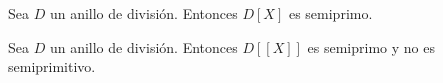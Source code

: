 \begin{example}
	Sea $D$ un anillo de división. Entonces $D[X]$ es semiprimo.
\end{example}

\begin{example}
	Sea $D$ un anillo de división. Entonces $D[[X]]$ es semiprimo y no es
	semiprimitivo.
\end{example}




%
%
%
%
%
%
